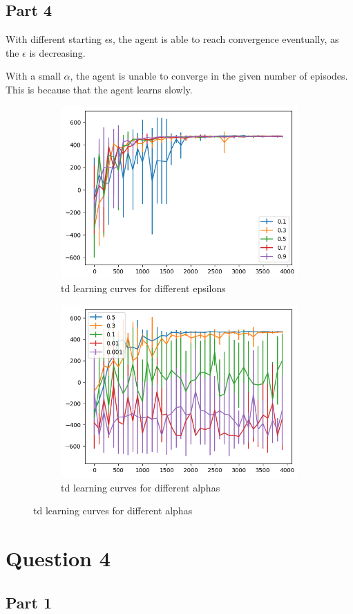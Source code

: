 \documentclass{article}
\begin{document}
    \subsection{Part 4}\label{subsec:question-3-4}
    With different starting $\epsilon$s, the agent is able to reach convergence eventually, as the $\epsilon$ is decreasing.

    With a small $\alpha$, the agent is unable to converge in the given number of episodes.
    This is because that the agent learns slowly.
    \begin{figure}[h]
        \begin{subfigure} {0.5\textwidth}
            \includegraphics[width=0.9\linewidth]{images/td_learning_curves_epsilon}
            \caption{td learning curves for different epsilons}\label{fig:td_learning_curves_epsilon}
        \end{subfigure}
        \begin{subfigure} {0.5\textwidth}
            \includegraphics[width=0.9\linewidth]{images/td_learning_curves_alphas}
            \caption{td learning curves for different alphas}\label{fig:td_learning_curves_alphas}
        \end{subfigure}
    \end{figure}


    \section{Question 4}\label{sec:question-4}

    \subsection{Part 1}\label{subsec:question-4-1}
\end{document}
